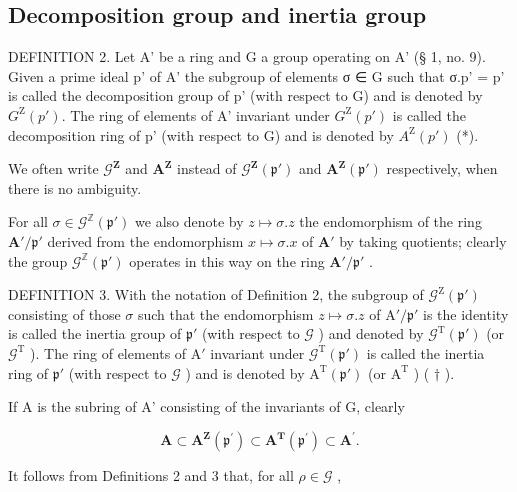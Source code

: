 \subsection{Decomposition group and inertia group}

DEFINITION 2. Let A' be a ring and G a group operating on A' (§ 1, no. 9). Given a prime ideal p' of A' the subgroup of elements σ ∈ G such that σ.p' = p' is called the decomposition group of p' (with respect to G) and is denoted by \(G^{\mathrm{Z}}(p')\). The ring of elements of A' invariant under \(G^{\mathrm{Z}}(p')\) is called the decomposition ring of p' (with respect to G) and is denoted by \(A^{\mathrm{Z}}(p')\) (*).

  We often write \(\mathcal{G}^{\mathbf{Z}}\) and \(\mathbf{A}^{\mathbf{Z}}\) instead of \(\mathcal{G}^{\mathbf{Z}}(\mathfrak{p}')\) and \(\mathbf{A}^{\mathbf{Z}}(\mathfrak{p}')\) respectively, when there is no ambiguity.

For all \(\sigma \in \mathcal{G}^{\mathbb{Z}}(\mathfrak{p}')\) we also denote by \(z \mapsto \sigma.z\) the endomorphism of the ring \(\mathbf{A}' / \mathfrak{p}'\) derived from the endomorphism \(x \mapsto \sigma.x\) of \(\mathbf{A}'\) by taking quotients; clearly the group \(\mathcal{G}^{\mathbb{Z}}(\mathfrak{p}')\) operates in this way on the ring \(\mathbf{A}' / \mathfrak{p}'\) .

DEFINITION 3. With the notation of Definition 2, the subgroup of \(\mathcal{G}^{\mathrm{Z}}(\mathfrak{p}')\) consisting of those \(\sigma\) such that the endomorphism \(z \mapsto \sigma.z\) of \(\mathrm{A}' / \mathfrak{p}'\) is the identity is called the inertia group of \(\mathfrak{p}'\) (with respect to \(\mathcal{G}\) ) and denoted by \(\mathcal{G}^{\mathrm{T}}(\mathfrak{p}')\) (or \(\mathcal{G}^{\mathrm{T}}\) ). The ring of elements of \(\mathrm{A}'\) invariant under \(\mathcal{G}^{\mathrm{T}}(\mathfrak{p}')\) is called the inertia ring of \(\mathfrak{p}'\) (with respect to \(\mathcal{G}\) ) and is denoted by \(\mathrm{A}^{\mathrm{T}}(\mathfrak{p}')\) (or \(\mathrm{A}^{\mathrm{T}}\) ) ( \(\dagger\) ).

If A is the subring of A' consisting of the invariants of G, clearly

\[
\mathbf {A} \subset \mathbf {A} ^ {\mathbf {Z}} (\mathfrak {p} ^ {\prime}) \subset \mathbf {A} ^ {\mathbf {T}} (\mathfrak {p} ^ {\prime}) \subset \mathbf {A} ^ {\prime}.\tag{1}
\]

It follows from Definitions 2 and 3 that, for all \(\rho \in \mathcal{G}\) ,

